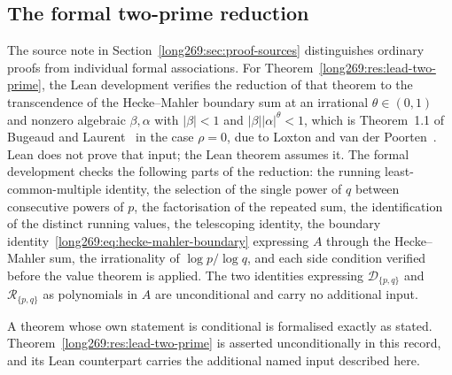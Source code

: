 \subsection*{The formal two-prime reduction}
\label{long269:sec:coverage}

The source note in Section~\ref{long269:sec:proof-sources} distinguishes
ordinary proofs from individual formal associations. For
Theorem~\ref{long269:res:lead-two-prime}, the Lean development
verifies the reduction of that theorem to the transcendence of the Hecke--Mahler boundary sum
at an irrational $\theta\in(0,1)$ and nonzero algebraic $\beta,\alpha$ with
$|\beta|<1$ and $|\beta||\alpha|^\theta<1$, which is Theorem~1.1 of Bugeaud
and Laurent~\cite{bugeaudlaurent2023} in the case $\rho=0$, due to Loxton and
van der Poorten~\cite[Theorem~8, p.~40]{loxtonvdp1977}.  Lean does not
prove that input; the Lean theorem assumes it.  The formal development checks the following parts of the reduction:
the running least-common-multiple identity, the selection of the single power
of $q$ between consecutive powers of $p$, the factorisation of the repeated
sum, the identification of the distinct running values, the telescoping
identity, the boundary
identity~\eqref{long269:eq:hecke-mahler-boundary} expressing $A$ through the
Hecke--Mahler sum, the irrationality of $\log p/\log q$, and each side
condition verified before the value theorem is applied.  The two identities
expressing $\mathcal D_{\{p,q\}}$ and $\mathcal R_{\{p,q\}}$ as polynomials in
$A$ are unconditional and carry no additional input.

A theorem whose own statement is conditional is formalised exactly as stated.
Theorem~\ref{long269:res:lead-two-prime} is asserted unconditionally in this
record, and its Lean counterpart carries the additional named input described
here.

